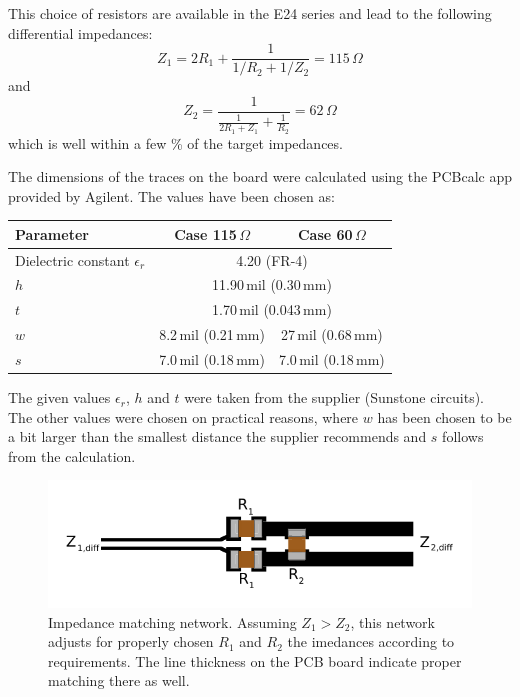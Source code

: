 This choice of resistors are available in the E24 series and lead to the following differential impedances:
\begin{equation}
Z_1 = 2R_1 + \frac{1}{1/R_2 + 1/Z_2} = 115\,\Omega
\end{equation}
and
\begin{equation}
Z_2 = \frac{1}{\frac{1}{2R_1+Z_1}+\frac{1}{R_2}} = 62\,\Omega
\end{equation}
which is well within a few \% of the target impedances.

The dimensions of the traces on the board were calculated using the PCBcalc app provided by Agilent. The values have been chosen as:
\begin{center}
\begin{tabular}{lcc}
    \toprule %
    Parameter & Case 115\,$\Omega$ & Case 60\,$\Omega$ \\
    \midrule %
    Dielectric constant $\epsilon_r$ & \multicolumn{2}{c}{4.20 (FR-4)} \\
    $h$ & \multicolumn{2}{c}{11.90\,mil (0.30\,mm)} \\
    $t$ & \multicolumn{2}{c}{1.70\,mil (0.043\,mm)} \\
    $w$ & 8.2\,mil (0.21\,mm) & 27\,mil (0.68\,mm) \\
    $s$ & 7.0\,mil (0.18\,mm) & 7.0\,mil (0.18\,mm) \\
    \bottomrule %
\end{tabular}
\end{center}
The given values $\epsilon_r$, $h$ and $t$ were taken from the supplier (Sunstone circuits). The other values were chosen on practical reasons, where $w$ has been chosen to be a bit larger than the smallest distance the supplier recommends and $s$ follows from the calculation.


\begin{figure}[hbtp]
	\begin{center}
	\includegraphics[width=.7\textwidth]{img/impedmatch.pdf}
	\end{center}
	\caption{Impedance matching network. Assuming $Z_1>Z_2$, this network adjusts for properly chosen $R_1$ and $R_2$ the imedances according to requirements. The line thickness on the PCB board indicate proper matching there as well.}
	\label{fig:mpedmatch}
\end{figure}

